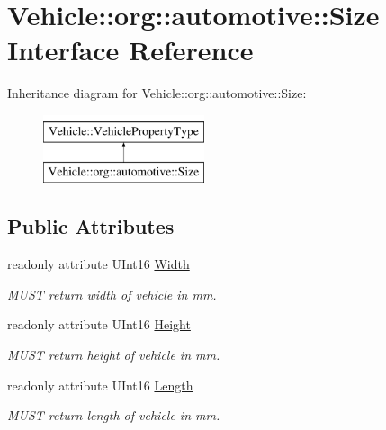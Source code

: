 \hypertarget{interfaceVehicle_1_1org_1_1automotive_1_1Size}{\section{Vehicle\-:\-:org\-:\-:automotive\-:\-:Size Interface Reference}
\label{interfaceVehicle_1_1org_1_1automotive_1_1Size}
}
Inheritance diagram for Vehicle\-:\-:org\-:\-:automotive\-:\-:Size\-:\begin{figure}[H]
\begin{center}
\leavevmode
\includegraphics[height=2.000000cm]{interfaceVehicle_1_1org_1_1automotive_1_1Size}
\end{center}
\end{figure}
\subsection*{Public Attributes}
\begin{DoxyCompactItemize}
\item 
readonly attribute U\-Int16 \hyperlink{interfaceVehicle_1_1org_1_1automotive_1_1Size_a467cfdce33a2ff36725d98d075e6e227}{Width}
\begin{DoxyCompactList}\small\item\em M\-U\-S\-T return width of vehicle in mm. \end{DoxyCompactList}\item 
readonly attribute U\-Int16 \hyperlink{interfaceVehicle_1_1org_1_1automotive_1_1Size_a3c8d4195088d50458dc405744e2ba677}{Height}
\begin{DoxyCompactList}\small\item\em M\-U\-S\-T return height of vehicle in mm. \end{DoxyCompactList}\item 
readonly attribute U\-Int16 \hyperlink{interfaceVehicle_1_1org_1_1automotive_1_1Size_a7a8836922871b5b9d6f6d5aac9b9c063}{Length}
\begin{DoxyCompactList}\small\item\em M\-U\-S\-T return length of vehicle in mm. \end{DoxyCompactList}\end{DoxyCompactItemize}


